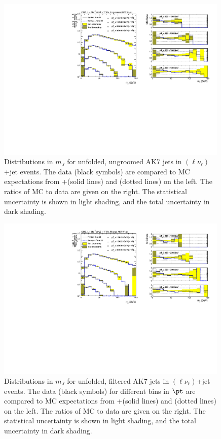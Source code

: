 \begin{figure}[!htb]
\includegraphics[width=0.99\textwidth]{figs/Wln/jetmassunf_ak7_log_W.pdf}
\caption{Distributions in $m_J$ for unfolded, ungroomed AK7 jets in  \PW$(\ell\nu_\ell)$+jet events. The data (black symbols) are compared to MC expectations from {\MADGRAPH}+\PYTHIA (solid lines) and \HERWIG (dotted lines) on the left. The ratios of MC to data are given on the right.
The statistical uncertainty is shown in light shading, and the total uncertainty in dark shading.}
\label{figs:AK7WmnInt1}
\end{figure}

\begin{figure}[!htb]
\includegraphics[width=0.99\textwidth]{figs/Wln/jetmassunf_ak7ft_log_W.pdf}
\caption{Distributions in $m_J$ for unfolded, filtered AK7 jets in \PW$(\ell\nu_\ell)$+jet events. The data (black symbols) for different bins in $\pt$ are compared to MC expectations from {\MADGRAPH}+\PYTHIA (solid lines) and \HERWIG (dotted lines) on the left. The ratios of MC to data are given on the right.
The statistical uncertainty is shown in light shading, and the total uncertainty in dark shading.}
\label{figs:AK7WmnInt3}
\end{figure}

